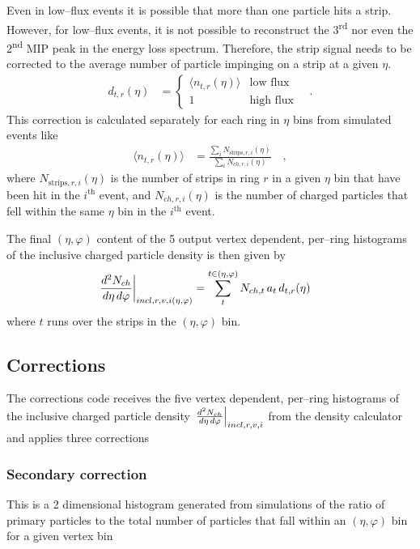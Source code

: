 \documentclass[11pt]{article}
\newcommand{\dndetadphi}[1][]{{\ensuremath%
    \ifx|#1|\else\left.\fi%
    \frac{d^2N_{ch}}{d\eta\,d\varphi}%
    \ifx|#1|\else\right|_{#1}\fi%
}}
\begin{document}
Even in low--flux events it is possible that more than one particle
hits a strip.  However, for low--flux events, it is not possible to
reconstruct the 3\textsuperscript{rd} nor even the
2\textsuperscript{nd} MIP peak in the energy loss spectrum.
Therefore, the strip signal needs to be corrected to the average
number of particle impinging on a strip at a given $\eta$.  
\begin{align}
  d_{t,r}(\eta) &= \left\{
    \begin{array}{cl} \langle
      n_{t,r}(\eta)\rangle & \text{low flux}\\
      1 & \text{high flux}
    \end{array}\right.\quad.
\end{align}
This correction is calculated separately for each ring in $\eta$ bins
from simulated events like
\begin{align}
  \label{eq:double_hit_corr} 
  \langle n_{t,r}(\eta)\rangle &= \frac{
    \sum_i N_{\text{strips},r,i}(\eta)}{
    \sum_i N_{ch,r,i}(\eta)}\quad,
\end{align}
where $N_{\text{strips},r,i}(\eta)$ is the number of strips in ring
$r$ in a given $\eta$ bin that have been hit in the $i^{\text{th}}$
event, and $N_{ch,r,i}(\eta)$ is the number of charged particles that
fell within the same $\eta$ bin in the $i^{\text{th}}$ event.

The final $(\eta,\varphi)$ content of the 5 output vertex dependent,
per--ring histograms of the inclusive charged particle density is then
given by
\begin{align}
  \label{eq:density}
  \dndetadphi[incl,r,v,i(\eta,\varphi)] &= \sum_t^{t\in(\eta,\varphi)}
  N_{ch,t}\,a_t\,d_{t,r}(\eta)
\end{align}
where $t$ runs over the strips in the $(\eta,\varphi)$ bin. 

\subsection{Corrections}

The corrections code receives the five vertex dependent,
per--ring histograms of the inclusive charged particle density
$\dndetadphi[incl,r,v,i]$ from the density calculator and applies
three corrections 

\subsubsection{Secondary correction}
  This is a 2 dimensional histogram generated from simulations of the
  ratio of primary particles to the total number of particles that
  fall within an $(\eta,\varphi)$ bin for a given vertex bin
\end{document}
